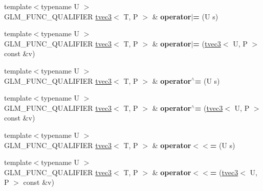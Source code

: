 \begin{DoxyCompactItemize}
\item 
\hypertarget{structglm_1_1detail_1_1tvec3_a019d5be6cb44504bcb2b91cedff0aed9}{{\footnotesize template$<$typename U $>$ }\\G\-L\-M\-\_\-\-F\-U\-N\-C\-\_\-\-Q\-U\-A\-L\-I\-F\-I\-E\-R \hyperlink{structglm_1_1detail_1_1tvec3}{tvec3}$<$ T, P $>$ \& {\bfseries operator$\vert$=} (U s)}\label{structglm_1_1detail_1_1tvec3_a019d5be6cb44504bcb2b91cedff0aed9}

\item 
\hypertarget{structglm_1_1detail_1_1tvec3_a059fd49c5bed06205e0703683cbaf3e0}{{\footnotesize template$<$typename U $>$ }\\G\-L\-M\-\_\-\-F\-U\-N\-C\-\_\-\-Q\-U\-A\-L\-I\-F\-I\-E\-R \hyperlink{structglm_1_1detail_1_1tvec3}{tvec3}$<$ T, P $>$ \& {\bfseries operator$\vert$=} (\hyperlink{structglm_1_1detail_1_1tvec3}{tvec3}$<$ U, P $>$ const \&v)}\label{structglm_1_1detail_1_1tvec3_a059fd49c5bed06205e0703683cbaf3e0}

\item 
\hypertarget{structglm_1_1detail_1_1tvec3_a20e0ed2f3f08cc1028badb8b550ec746}{{\footnotesize template$<$typename U $>$ }\\G\-L\-M\-\_\-\-F\-U\-N\-C\-\_\-\-Q\-U\-A\-L\-I\-F\-I\-E\-R \hyperlink{structglm_1_1detail_1_1tvec3}{tvec3}$<$ T, P $>$ \& {\bfseries operator$^\wedge$=} (U s)}\label{structglm_1_1detail_1_1tvec3_a20e0ed2f3f08cc1028badb8b550ec746}

\item 
\hypertarget{structglm_1_1detail_1_1tvec3_afda445ba27ed5ca10a39b94b8e764fcb}{{\footnotesize template$<$typename U $>$ }\\G\-L\-M\-\_\-\-F\-U\-N\-C\-\_\-\-Q\-U\-A\-L\-I\-F\-I\-E\-R \hyperlink{structglm_1_1detail_1_1tvec3}{tvec3}$<$ T, P $>$ \& {\bfseries operator$^\wedge$=} (\hyperlink{structglm_1_1detail_1_1tvec3}{tvec3}$<$ U, P $>$ const \&v)}\label{structglm_1_1detail_1_1tvec3_afda445ba27ed5ca10a39b94b8e764fcb}

\item 
\hypertarget{structglm_1_1detail_1_1tvec3_adf6a5496bcd1b0ece06a76b27117a134}{{\footnotesize template$<$typename U $>$ }\\G\-L\-M\-\_\-\-F\-U\-N\-C\-\_\-\-Q\-U\-A\-L\-I\-F\-I\-E\-R \hyperlink{structglm_1_1detail_1_1tvec3}{tvec3}$<$ T, P $>$ \& {\bfseries operator$<$$<$=} (U s)}\label{structglm_1_1detail_1_1tvec3_adf6a5496bcd1b0ece06a76b27117a134}

\item 
\hypertarget{structglm_1_1detail_1_1tvec3_aabbf88378ef21973abac8cdacd0b4117}{{\footnotesize template$<$typename U $>$ }\\G\-L\-M\-\_\-\-F\-U\-N\-C\-\_\-\-Q\-U\-A\-L\-I\-F\-I\-E\-R \hyperlink{structglm_1_1detail_1_1tvec3}{tvec3}$<$ T, P $>$ \& {\bfseries operator$<$$<$=} (\hyperlink{structglm_1_1detail_1_1tvec3}{tvec3}$<$ U, P $>$ const \&v)}\label{structglm_1_1detail_1_1tvec3_aabbf88378ef21973abac8cdacd0b4117}


\end{DoxyCompactItemize}
